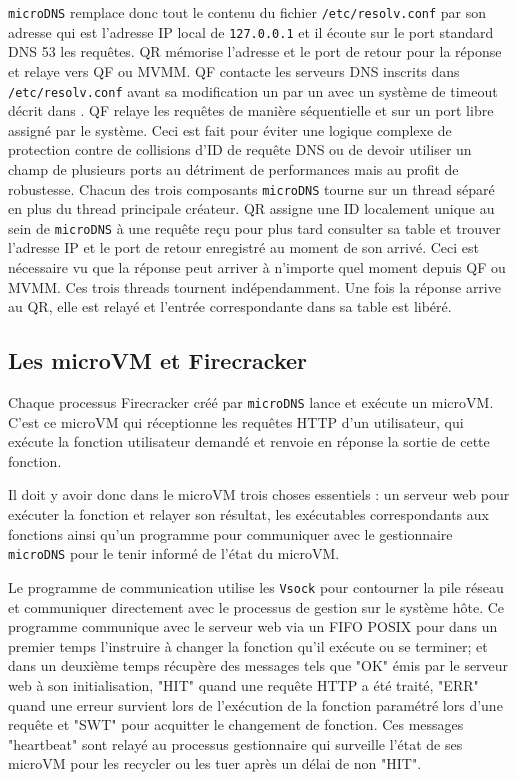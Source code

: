 \documentclass[12pt]{article}
\begin{document}
\texttt{microDNS} remplace donc tout le contenu du fichier \texttt{/etc/resolv.conf} par son adresse qui est l'adresse IP local de \texttt{127.0.0.1} et il écoute sur le port standard DNS 53 les requêtes. QR mémorise l'adresse et le port de retour pour la réponse et relaye vers QF ou MVMM. QF contacte les serveurs DNS inscrits dans \texttt{/etc/resolv.conf} avant sa modification un par un avec un système de timeout décrit dans . QF relaye les requêtes de manière séquentielle et sur un port libre assigné par le système. Ceci est fait pour éviter une logique complexe de protection contre de collisions d'ID de requête DNS ou de devoir utiliser un champ de plusieurs ports au détriment de performances mais au profit de robustesse. Chacun des trois composants \texttt{microDNS} tourne sur un thread séparé en plus du thread principale créateur. QR assigne une ID localement unique au sein de \texttt{microDNS} à une requête reçu pour plus tard consulter sa table et trouver l'adresse IP et le port de retour enregistré au moment de son arrivé. Ceci est nécessaire vu que la réponse peut arriver à n'importe quel moment depuis QF ou MVMM. Ces trois threads tournent indépendamment. Une fois la réponse arrive au QR, elle est relayé et l'entrée correspondante dans sa table est libéré.

\subsection{Les microVM et Firecracker}
Chaque processus Firecracker créé par \texttt{microDNS} lance et exécute un microVM. C'est ce microVM qui réceptionne les requêtes HTTP d'un utilisateur, qui exécute la fonction utilisateur demandé et renvoie en réponse la sortie de cette fonction.

Il doit y avoir donc dans le microVM trois choses essentiels : un serveur web pour exécuter la fonction et relayer son résultat, les exécutables correspondants aux fonctions ainsi qu'un programme pour communiquer avec le gestionnaire \texttt{microDNS} pour le tenir informé de l'état du microVM.

Le programme de communication utilise les \texttt{Vsock} pour contourner la pile réseau et communiquer directement avec le processus de gestion sur le système hôte. Ce programme communique avec le serveur web via un FIFO POSIX pour dans un premier temps l'instruire à changer la fonction qu'il exécute ou se terminer; et dans un deuxième temps récupère des messages tels que "OK" émis par le serveur web à son initialisation, "HIT" quand une requête HTTP a été traité, "ERR" quand une erreur survient lors de l'exécution de la fonction paramétré lors d'une requête et "SWT" pour acquitter le changement de fonction. Ces messages "heartbeat" sont relayé au processus gestionnaire qui surveille l'état de ses microVM pour les recycler ou les tuer après un délai de non "HIT".
\end{document}
